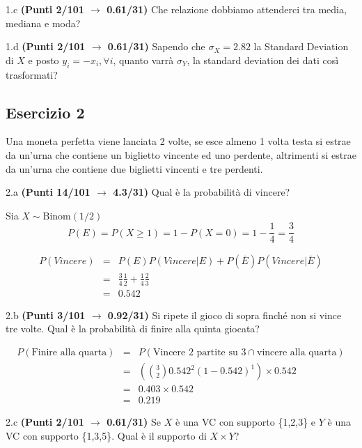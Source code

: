 \documentclass[
  11pt,
]{book}
\theoremstyle{mytheoremstyle}
\theoremstyle{mydefstyle}
\newenvironment{sol}
  {
  \begin{tcolorbox}[enhanced,breakable,arc=0.1mm,boxrule=1pt,colback=white,colframe=iblue,
  title=\bf \fontfamily{lmss}\selectfont \hspace{.5 cm} Soluzione,drop fuzzy shadow]

}{
\end{tcolorbox}
  }
\begin{document}
1.c \textbf{(Punti 2/101 \(\rightarrow\) 0.61/31)} Che relazione dobbiamo attenderci tra media, mediana e moda?

1.d \textbf{(Punti 2/101 \(\rightarrow\) 0.61/31)} Sapendo che \(\sigma_X=2.82\) la Standard Deviation di \(X\)
e posto \(y_i=-x_i, \forall i\), quanto varrà \(\sigma_Y\), la standard deviation dei dati così
trasformati?

\subsection{Esercizio 2}\label{esercizio-2-18}

Una moneta perfetta viene lanciata 2 volte, se esce almeno 1 volta testa si estrae da un'urna che contiene un biglietto vincente ed uno perdente, altrimenti si estrae da un'urna che contiene due biglietti vincenti e tre perdenti.

2.a \textbf{(Punti 14/101 \(\rightarrow\) 4.3/31)} Qual è la probabilità di vincere?

\begin{sol}
Sia \(X\sim\text{Binom}(1/2)\)
\[P(E)=P(X\ge 1)=1-P(X=0)=1-\frac 14=\frac 34\]

\begin{eqnarray*}
  P(Vincere) &=& P(E)P(Vincere|E)+P(\bar E)P(Vincere|\bar E)\\
  &=& \frac 34\frac 12 + \frac 14 \frac 23\\
  &=& 0.542
\end{eqnarray*}

\end{sol}

2.b \textbf{(Punti 3/101 \(\rightarrow\) 0.92/31)} Si ripete il gioco di sopra finché non si vince tre volte. Qual è la probabilità di finire alla quinta giocata?

\begin{sol}
\begin{eqnarray*}
  P(\text{Finire alla quarta}) &=&  P(\text{Vincere 2 partite su 3}\cap\text{vincere alla quarta})\\
  &=& \left(\binom{3}{2}0.542^2(1-0.542)^1\right)\times 0.542\\
  &=& 0.403\times 0.542\\
  &=& 0.219
\end{eqnarray*}

\end{sol}

2.c \textbf{(Punti 2/101 \(\rightarrow\) 0.61/31)} Se \(X\) è una VC con supporto \{1,2,3\} e \(Y\) è una VC con
supporto \{1,3,5\}.
Qual è il supporto di \(X\times Y\)?
\end{document}
